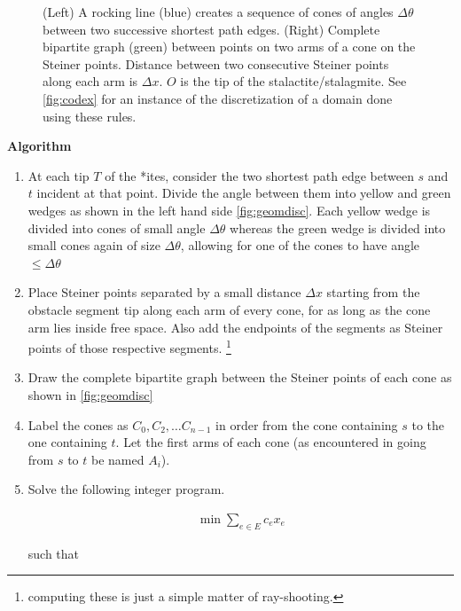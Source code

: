 \begin{figure}[H]
\begin{minipage}[t]{0.3\textwidth}
\end{minipage}
\caption{(Left) A rocking line (blue) creates a sequence of cones of angles 
     $\Delta \theta$ between two successive shortest path edges. (Right) Complete bipartite graph (green) between points on two arms of a cone on the Steiner points. 
              Distance between two consecutive Steiner points along each arm is $\Delta x$. $O$ is the tip of the 
      stalactite/stalagmite. See \autoref{fig:codex} for an instance of the discretization of a domain done using these rules.}
\label{fig:geomdisc}
\end{figure}




{\large \textbf{Algorithm}}

 \begin{enumerate}
  \item At each tip $T$ of the *ites, consider the two shortest path edge between $s$ and $t$ incident at that point. Divide the angle between them into 
        yellow and green wedges as shown in the left hand side \autoref{fig:geomdisc}. Each yellow wedge is divided into cones of small angle $\Delta \theta$
        whereas the green wedge is divided into small cones again of size $\Delta \theta$, allowing for one of the cones to have angle $\leq \Delta \theta$

 \item Place Steiner points separated by a small distance $\Delta x$ starting from the obstacle segment tip along each arm of every cone, 
        for as long as the cone arm lies inside free space. Also add the endpoints of the segments as Steiner points of those respective segments. 
       \footnote{computing these is just a simple matter of ray-shooting. }
 \item Draw the complete bipartite graph between the Steiner points of each cone  as shown in \autoref{fig:geomdisc}
 \item Label the cones as $C_0, C_2, \ldots C_{n-1}$ in order from the cone containing $s$ to the one containing $t$. 
       Let the first arms of each cone (as encountered in going from $s$ to $t$ be named $A_i$).
       
 \item Solve the following integer program. 
           

\begin{align}
\min \sum_{e \in E} c_e x_e  
\end{align}

such that 


\end{enumerate}
